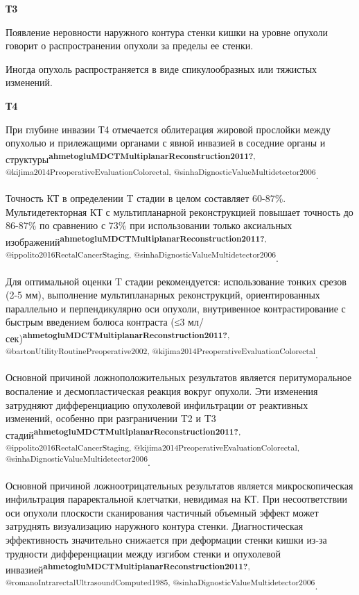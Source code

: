 \documentclass[
  russian,
  12pt,
  a4paper,
]{report}
\begin{document}
\textbf{Т3}

Появление неровности наружного контура стенки кишки на уровне опухоли
говорит о распространении опухоли за пределы ее стенки.

Иногда опухоль распространяется в виде спикулообразных или тяжистых
изменений.

\textbf{Т4}

При глубине инвазии Т4 отмечается облитерация жировой прослойки между
опухолью и прилежащими органами с явной инвазией в соседние органы и
структуры\textsuperscript{\textbf{ahmetogluMDCTMultiplanarReconstruction2011?},
@kijima2014PreoperativeEvaluationColorectal,
@sinhaDignosticValueMultidetector2006}.

Точность КТ в определении T стадии в целом составляет 60-87\%.
Мультидетекторная КТ с мультипланарной реконструкцией повышает точность
до 86-87\% по сравнению с 73\% при использовании только аксиальных
изображений\textsuperscript{\textbf{ahmetogluMDCTMultiplanarReconstruction2011?},
@ippolito2016RectalCancerStaging,
@sinhaDignosticValueMultidetector2006}.

Для оптимальной оценки T стадии рекомендуется: использование тонких
срезов (2-5 мм), выполнение мультипланарных реконструкций,
ориентированных параллельно и перпендикулярно оси опухоли, внутривенное
контрастирование с быстрым введением болюса контраста (≤3
мл/сек)\textsuperscript{\textbf{ahmetogluMDCTMultiplanarReconstruction2011?},
@bartonUtilityRoutinePreoperative2002,
@kijima2014PreoperativeEvaluationColorectal}.

Основной причиной ложноположительных результатов является
перитуморальное воспаление и десмопластическая реакция вокруг опухоли.
Эти изменения затрудняют дифференциацию опухолевой инфильтрации от
реактивных изменений, особенно при разграничении T2 и T3
стадий\textsuperscript{\textbf{ahmetogluMDCTMultiplanarReconstruction2011?},
@ippolito2016RectalCancerStaging,
@kijima2014PreoperativeEvaluationColorectal,
@sinhaDignosticValueMultidetector2006}.

Основной причиной ложноотрицательных результатов является
микроскопическая инфильтрация параректальной клетчатки, невидимая на КТ.
При несоответствии оси опухоли плоскости сканирования частичный объемный
эффект может затруднять визуализацию наружного контура стенки.
Диагностическая эффективность значительно снижается при деформации
стенки кишки из-за трудности дифференциации между изгибом стенки и
опухолевой
инвазией\textsuperscript{\textbf{ahmetogluMDCTMultiplanarReconstruction2011?},
@romanoIntrarectalUltrasoundComputed1985,
@sinhaDignosticValueMultidetector2006}.
\end{document}
